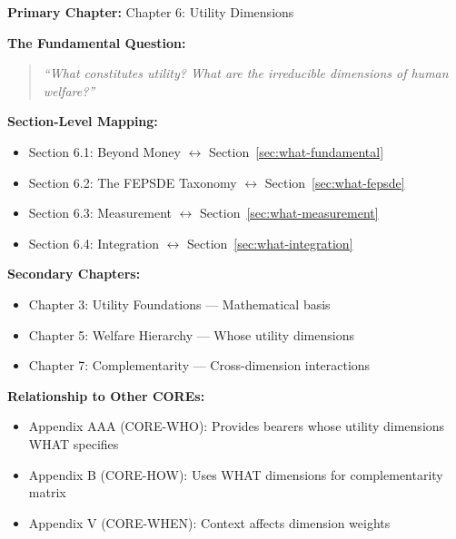 \begin{tcolorbox}[colback=purple!5!white, colframe=purple!75!black,
    title=Chapter Linkage]

\textbf{Primary Chapter:} Chapter 6: Utility Dimensions

\vspace{0.3em}
\textbf{The Fundamental Question:}
\begin{quote}
\textit{``What constitutes utility? What are the irreducible dimensions of human welfare?''}
\end{quote}

\textbf{Section-Level Mapping:}
\begin{itemize}[nosep]
\item Section 6.1: Beyond Money $\leftrightarrow$ Section~\ref{sec:what-fundamental}
\item Section 6.2: The FEPSDE Taxonomy $\leftrightarrow$ Section~\ref{sec:what-fepsde}
\item Section 6.3: Measurement $\leftrightarrow$ Section~\ref{sec:what-measurement}
\item Section 6.4: Integration $\leftrightarrow$ Section~\ref{sec:what-integration}
\end{itemize}

\textbf{Secondary Chapters:}
\begin{itemize}[nosep]
\item Chapter 3: Utility Foundations --- Mathematical basis
\item Chapter 5: Welfare Hierarchy --- Whose utility dimensions
\item Chapter 7: Complementarity --- Cross-dimension interactions
\end{itemize}

\textbf{Relationship to Other COREs:}
\begin{itemize}[nosep]
\item Appendix AAA (CORE-WHO): Provides bearers whose utility dimensions WHAT specifies
\item Appendix B (CORE-HOW): Uses WHAT dimensions for complementarity matrix
\item Appendix V (CORE-WHEN): Context affects dimension weights
\end{itemize}

\end{tcolorbox}


